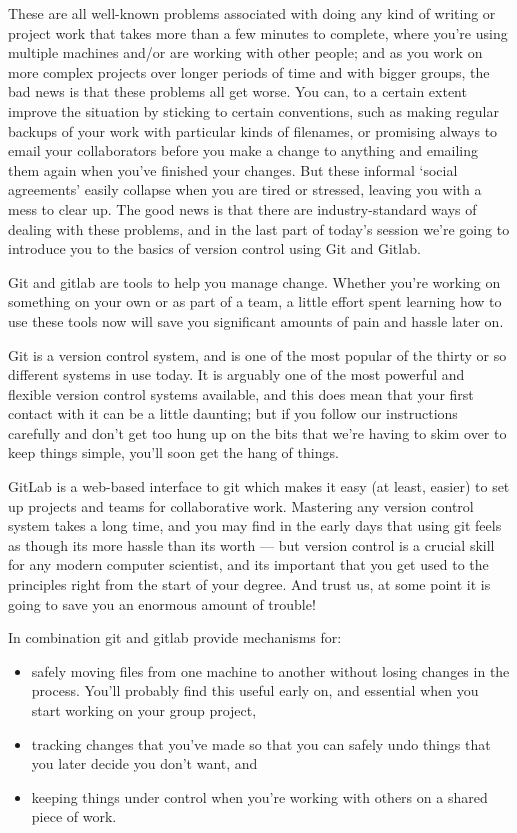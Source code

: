 These are all well-known problems associated with doing any kind of writing or project work that takes more than a few minutes to complete, where you're using multiple machines and/or are working with other people; and as you work on more complex projects over longer periods of time and with bigger groups, the bad news is that these problems all get worse. You can, to a certain extent improve the situation by sticking to certain conventions, such as making regular backups of your work with particular kinds of filenames, or promising always to email your collaborators before you make a change to anything and emailing them again when you've finished your changes. But these informal `social agreements' easily collapse when you are tired or stressed, leaving you with a mess to clear up. The good news is that there are industry-standard ways of dealing with these problems, and in the last part of today's session we're going to introduce you to the basics of version control using Git and Gitlab. 

Git and gitlab are tools to help you manage change. Whether you're working on something on your own or as part of a team, a little effort spent learning how to use these tools now will save you significant amounts of pain and hassle later on. 

Git is a version control system, and is one of the most popular of the thirty or so different systems in use today. It is arguably one of the most powerful and flexible version control systems available, and this does mean that your first contact with it can be a little daunting; but if you follow our instructions carefully and don't get too hung up on the bits that we're having to skim over to keep things simple, you'll soon get the hang of things. 

GitLab is a web-based interface to git which makes it easy (at least, easier) to set up projects and teams for collaborative work. Mastering any version control system takes a long time, and you may find in the early days that using git feels as though its more hassle than its worth --- but version control is a crucial skill for any modern computer scientist, and its important that you get used to the principles right from the start of your degree. And trust us, at some point it is going to save you an enormous amount of trouble!

In combination git and gitlab provide mechanisms for:
\begin{itemize}
\item safely moving files from one machine to another without losing changes in the process. You'll probably find this useful early on, and essential when you start working on your group project,
\item tracking changes that you've made so that you can safely undo things that you later decide you don't want, and
\item keeping things under control when you're working with others on a shared piece of work.
\end{itemize}

